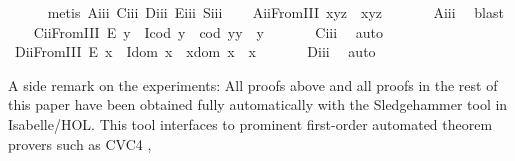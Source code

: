 \begin{isabellebody}
%
\isadelimproof
\ \ \ \ %
\endisadelimproof
%
\isatagproof
{}\isamarkupfalse%
\ {\isacharparenleft}metis\ A\isactrlsub i\isactrlsub i\isactrlsub i\ C\isactrlsub i\isactrlsub i\isactrlsub i\ D\isactrlsub i\isactrlsub i\isactrlsub i\ E\isactrlsub i\isactrlsub i\isactrlsub i\ S\isactrlsub i\isactrlsub i\isactrlsub i{\isacharparenright}%
\endisatagproof
{\isafoldproof}%
%
\isadelimproof
\isanewline
%
\endisadelimproof
\ \ \isamarkupfalse%
\ A\isactrlsub i\isactrlsub iFromIII{\isacharcolon}\ {\isachardoublequoteopen}x{\isasymcdot}{\isacharparenleft}y{\isasymcdot}z{\isacharparenright}\ {\isasymcong}\ {\isacharparenleft}x{\isasymcdot}y{\isacharparenright}{\isasymcdot}z{\isachardoublequoteclose}\ \isanewline
%
\isadelimproof
\ \ \ \ %
\endisadelimproof
%
\isatagproof
{}\isamarkupfalse%
\ A\isactrlsub i\isactrlsub i\isactrlsub i\ \isamarkupfalse%
\ blast%
\endisatagproof
{\isafoldproof}%
%
\isadelimproof
\isanewline
%
\endisadelimproof
\ \ \isamarkupfalse%
\ C\isactrlsub i\isactrlsub iFromIII{\isacharcolon}\ {\isachardoublequoteopen}E\ y\ \isactrlbold {\isasymrightarrow}\ {\isacharparenleft}I{\isacharparenleft}cod\ y{\isacharparenright}\ \isactrlbold {\isasymand}\ {\isacharparenleft}cod\ y{\isacharparenright}{\isasymcdot}y\ {\isasymcong}\ y{\isacharparenright}{\isachardoublequoteclose}\ \isanewline
%
\isadelimproof
\ \ \ \ %
\endisadelimproof
%
\isatagproof
{}\isamarkupfalse%
\ C\isactrlsub i\isactrlsub i\isactrlsub i\ \isamarkupfalse%
\ auto%
\endisatagproof
{\isafoldproof}%
%
\isadelimproof
\isanewline
%
\endisadelimproof
\ \ \isamarkupfalse%
\ D\isactrlsub i\isactrlsub iFromIII{\isacharcolon}\ {\isachardoublequoteopen}E\ x\ \isactrlbold {\isasymrightarrow}\ {\isacharparenleft}I{\isacharparenleft}dom\ x{\isacharparenright}\ \isactrlbold {\isasymand}\ x{\isasymcdot}{\isacharparenleft}dom\ x{\isacharparenright}\ {\isasymcong}\ x{\isacharparenright}{\isachardoublequoteclose}\ \isanewline
%
\isadelimproof
\ \ \ \ %
\endisadelimproof
%
\isatagproof
{}\isamarkupfalse%
\ D\isactrlsub i\isactrlsub i\isactrlsub i\ \isamarkupfalse%
\ auto%
\endisatagproof
{\isafoldproof}%
%
\isadelimproof
%
\endisadelimproof
%
\begin{isamarkuptext}%
A side remark on the experiments: All proofs above and all proofs in the rest of this paper 
 have been obtained fully automatically with the Sledgehammer tool in Isabelle/HOL. This
 tool interfaces to prominent first-order automated theorem provers such as CVC4 \cite{CVC4}, 

\end{isamarkuptext}
\end{isabellebody}
